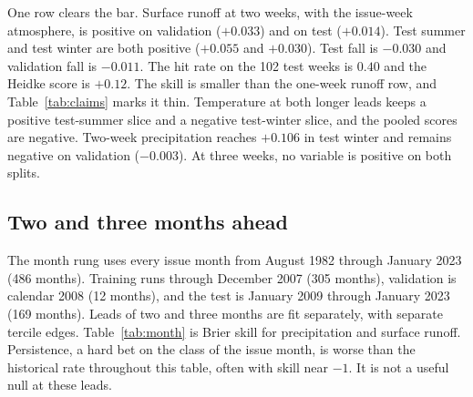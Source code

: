 \documentclass{ametsocV6.2}
\begin{document}
One row clears the bar.
Surface runoff at two weeks, with the issue-week atmosphere, is positive on validation ($+0.033$) and on test ($+0.014$).
Test summer and test winter are both positive ($+0.055$ and $+0.030$).
Test fall is $-0.030$ and validation fall is $-0.011$.
The hit rate on the 102 test weeks is $0.40$ and the Heidke score is $+0.12$.
The skill is smaller than the one-week runoff row, and Table~\ref{tab:claims} marks it thin.
Temperature at both longer leads keeps a positive test-summer slice and a negative test-winter slice, and the pooled scores are negative.
Two-week precipitation reaches $+0.106$ in test winter and remains negative on validation ($-0.003$).
At three weeks, no variable is positive on both splits.

\subsection{Two and three months ahead}
\label{sec:month}

The month rung uses every issue month from August 1982 through January 2023 (486 months).
Training runs through December 2007 (305 months), validation is calendar 2008 (12 months), and the test is January 2009 through January 2023 (169 months).
Leads of two and three months are fit separately, with separate tercile edges.
Table~\ref{tab:month} is Brier skill for precipitation and surface runoff.
Persistence, a hard bet on the class of the issue month, is worse than the historical rate throughout this table, often with skill near $-1$.
It is not a useful null at these leads.
\end{document}
